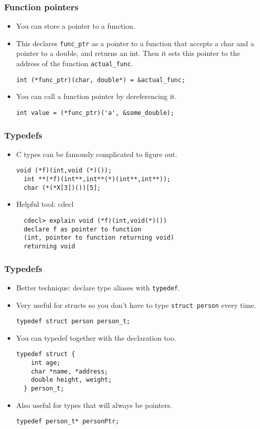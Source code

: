 \begin{frame}[fragile]
  \frametitle{Function pointers}
  \begin{itemize}
  \item You can store a pointer to a function.
  \item This declares \texttt{func\_ptr} as a pointer to a function that accepts
    a char and a pointer to a double, and returns an int. Then it sets this
    pointer to the address of the function \texttt{actual\_func}.
\begin{lstlisting}[style=c]
  int (*func_ptr)(char, double*) = &actual_func;
\end{lstlisting}
  \item You can call a function pointer by dereferencing it.
\begin{lstlisting}[style=c]
  int value = (*func_ptr)('a', &some_double);
\end{lstlisting}
  \end{itemize}
\end{frame}

\begin{frame}[fragile]
  \frametitle{Typedefs}
  \begin{itemize}
  \item C types can be famously complicated to figure out.
\begin{lstlisting}[style=c]
  void (*f)(int,void (*)());
  int **(*f)(int**,int**(*)(int**,int**));
  char (*(*X[3])())[5];
\end{lstlisting}
  \item Helpful tool: cdecl
\begin{lstlisting}
  cdecl> explain void (*f)(int,void(*)())
  declare f as pointer to function
  (int, pointer to function returning void)
  returning void
\end{lstlisting}
  \end{itemize}
\end{frame}

\begin{frame}[fragile]
  \frametitle{Typedefs}
  \begin{itemize}
  \item Better technique: declare type aliases with \texttt{typedef}.
  \item Very useful for structs so you don't have to type \texttt{struct person}
    every time.
\begin{lstlisting}[style=c]
  typedef struct person person_t;
\end{lstlisting}
  \item You can typedef together with the declaration too.
\begin{lstlisting}[style=c]
  typedef struct {
    int age;
    char *name, *address;
    double height, weight;
  } person_t;
\end{lstlisting}
  \item Also useful for types that will always be pointers.
\begin{lstlisting}[style=c]
  typedef person_t* personPtr;
\end{lstlisting}
  \end{itemize}
\end{frame}


